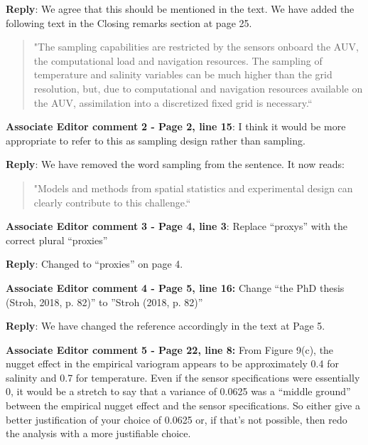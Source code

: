 \documentclass[a4paper]{article}
\def\aecom{\textbf{Associate Editor comment }}
\def\reply{\textbf{Reply}}
\begin{document}
\vspace{5mm}
\reply: We agree that this should be mentioned in the text. We have added the following text in the Closing remarks section at page 25.

\begin{quote}
    "The sampling capabilities are restricted by the sensors onboard the AUV, the computational load and navigation resources. The sampling of temperature and salinity variables can be much higher than the grid resolution, but, due to computational and navigation resources available on the AUV, assimilation into a discretized fixed grid is necessary.``
\end{quote}

\vspace{5mm}
\noindent \aecom \textbf{2 - Page 2, line 15}:  I think it would be more appropriate to refer to this as sampling design rather than sampling.

\vspace{5mm}
\reply: We have removed the word sampling from the sentence. It now reads:

\begin{quote}
    "Models and methods from spatial statistics and experimental design can clearly contribute to this challenge.``
\end{quote}

\vspace{5mm}
\noindent \aecom \textbf{3 - Page 4, line 3}:  Replace “proxys” with the correct plural “proxies”

\vspace{5mm}
\reply: Changed to “proxies” on page 4.

\vspace{5mm}
\noindent \aecom \textbf{4 - Page 5, line 16:}  Change  “the  PhD  thesis  (Stroh,  2018,  p.  82)”  to ”Stroh (2018, p. 82)”

\vspace{5mm}
\reply: We have changed the reference accordingly in the text at Page 5. 

\vspace{5mm}
\noindent \aecom \textbf{5 - Page 22, line 8:}  From Figure 9(c), the nugget effect in the empirical variogram appears to be approximately 0.4 for salinity and 0.7 for temperature.  Even if the sensor specifications were essentially 0, it would be a stretch to say that a variance of 0.0625 was a “middle ground” between the empirical nugget effect and the sensor specifications.  So either give a better justification of your choice of 0.0625 or, if that’s not possible, then redo the analysis with a more justifiable choice.
\end{document}
